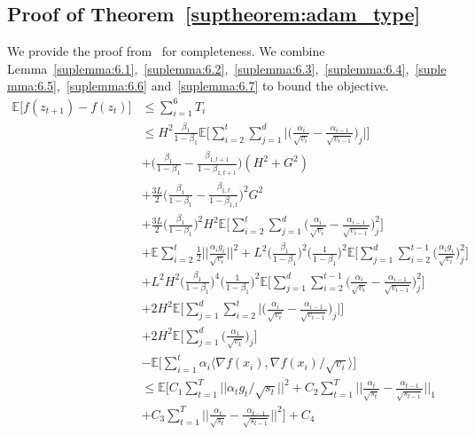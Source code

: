 \documentclass{article}
\begin{document}
\subsection*{Proof of Theorem~\ref{suptheorem:adam_type}}
We provide the proof from~\cite{chen2018convergence} for completeness. We combine Lemma~\ref{suplemma:6.1},~\ref{suplemma:6.2},~\ref{suplemma:6.3},~\ref{suplemma:6.4},~\ref{suplemma:6.5},~\ref{suplemma:6.6} and~\ref{suplemma:6.7} to bound the objective.
\begin{align}
\mathbb{E} \Big[ f(z_{t+1}) - f(z_t) \Big] &\leq \sum_{i=1}^6 T_i \nonumber \\
&\leq H^2 \frac{\beta_1}{1-\beta_1} \mathbb{E} \Bigg[ \sum_{i=2}^t \sum_{j=1}^d \Big \vert \Big( \frac{\alpha_i}{\sqrt{v_i}} - \frac{\alpha_{i-1}}{\sqrt{v_{i-1}}} \Big)_j \Big \vert \Bigg] \nonumber \\
&+ \Big( \frac{\beta_1}{1-\beta_1} - \frac{\beta_{1,t+1}}{1-\beta_{1,t+1}}\Big) (H^2+G^2) \nonumber \\
&+ \frac{3L}{2}\Big( \frac{\beta_1}{1-\beta_1} - \frac{\beta_{1,t}}{1-\beta_{1,t}} \Big)^2G^2 \nonumber \\
&+ \frac{3L}{2} \Big( \frac{\beta_1}{1-\beta_1} \Big)^2 H^2 \mathbb{E} \Bigg[ \sum_{i=2}^t \sum_{j=1}^d \Big( \frac{\alpha_i}{\sqrt{v_i}} - \frac{\alpha_{i-1}}{\sqrt{v_{i-1}}} \Big)^2_j \Bigg] \nonumber \\
&+ \mathbb{E} \sum_{i=2}^t \frac{1}{2} \Big \vert \Big \vert \frac{\alpha_i g_i}{\sqrt{v_i}} \Big \vert \Big \vert^2 + L^2 \Big( \frac{\beta_1}{1-\beta_1} \Big)^2 \Big( \frac{1}{1-\beta_1} \Big)^2 \mathbb{E} \Bigg[ \sum_{j=1}^d \sum_{i=2}^{t-1} \Big( \frac{\alpha_i g_i}{ \sqrt{v_i}} \Big)^2_j \Bigg] \nonumber \\
&+ L^2 H^2 \Big( \frac{\beta_1}{1-\beta_1} \Big)^4 \Big( \frac{1}{1-\beta_1} \Big)^2 \mathbb{E} \Bigg[ \sum_{j=1}^d \sum_{i=2}^{t-1} \Big( \frac{\alpha_i}{\sqrt{v_i}} - \frac{\alpha_{i-1}}{\sqrt{v_{i-1}}} \Big)^2_j \Bigg] \nonumber \\
&+ 2H^2\mathbb{E} \Bigg[ \sum_{j=1}^d \sum_{i=2}^t \Bigg \vert \Big( \frac{\alpha_i}{\sqrt{v_i}} - \frac{\alpha_{i-1}}{\sqrt{v_{i-1}}} \Big)_j \Bigg \vert \Bigg] \nonumber \\
&+ 2H^2 \mathbb{E} \Bigg[ \sum_{j=1}^d \Big( \frac{\alpha_1}{\sqrt{v_1}} \Big)_j \Bigg] \nonumber \\
&- \mathbb{E} \Bigg[ \sum_{i=1}^t \alpha_i \langle \nabla f(x_i), \nabla f(x_i) / \sqrt{v_i} \rangle \Bigg] \nonumber \\
&\leq \mathbb{E} \Big[ C_1 \sum_{t=1}^T \Big \vert \Big \vert \alpha_t g_t/ \sqrt{s_t} \Big \vert \Big \vert^2 
    + C_2 \sum_{t=1}^T \Big \vert \Big \vert \frac{\alpha_t}{\sqrt{s_t}} - \frac{\alpha_{t-1}}{ \sqrt{ s_{t-1}}} \Big \vert \Big \vert_1 \nonumber \\
    &+ C_3 \sum_{t=1}^T \Big \vert \Big \vert \frac{\alpha_t}{\sqrt{s_t}} - \frac{\alpha_{t-1}}{\sqrt{s_{t-1}}} \Big \vert \Big \vert^2 \Big] + C_4
\end{align}
\end{document}
